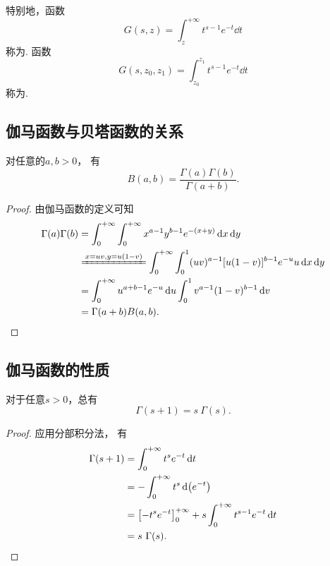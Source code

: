 特别地，函数\[
	G(s,z) = \int_z^{+\infty} t^{s-1} e^{-t} \dd{t}
\]
称为.
函数\[
	G(s,z_0,z_1) = \int_{z_0}^{z_1} t^{s-1} e^{-t} \dd{t}
\]
称为.

\subsection{伽马函数与贝塔函数的关系}
\begin{theorem}
对任意的\(a,b>0\)，
有\begin{equation}\label{equation:定积分.伽马函数与贝塔函数的关系}
	B(a,b) = \frac{\Gamma(a) \Gamma(b)}{\Gamma(a+b)}.
\end{equation}
\begin{proof}
由伽马函数的定义可知\begin{align*}
	\Gamma(a) \Gamma(b)
	&= \int_0^{+\infty} \int_0^{+\infty} x^{a-1} y^{b-1} e^{-(x+y)} \dd{x}\dd{y} \\
	&\xlongequal{x=uv,y=u(1-v)}
	\int_0^{+\infty} \int_0^1 (uv)^{a-1} [u(1-v)]^{b-1} e^{-u} u \dd{x}\dd{y} \\
	&=\int_0^{+\infty} u^{a+b-1} e^{-u} \dd{u}
		\int_0^1 v^{a-1} (1-v)^{b-1} \dd{v} \\
	&= \Gamma(a+b) B(a,b).
	\qedhere
\end{align*}
\end{proof}
\end{theorem}

\subsection{伽马函数的性质}
\begin{property}
对于任意\(s > 0\)，总有
\begin{equation}\label{equation:伽马函数.递推公式}
	\Gamma(s+1) = s~\Gamma(s).
\end{equation}
\begin{proof}
应用分部积分法，
有\begin{align*}
	\Gamma(s+1)
	&= \int_0^{+\infty} t^s e^{-t} \dd{t} \\
	&= -\int_0^{+\infty} t^s \dd(e^{-t}) \\
	&= \left[-t^s e^{-t}\right]_0^{+\infty}
		+ s \int_0^{+\infty} t^{s-1} e^{-t} \dd{t} \\
	&= s~\Gamma(s).
	\qedhere
\end{align*}
\end{proof}
\end{property}

